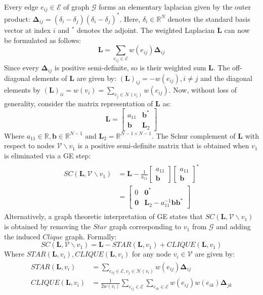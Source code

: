 \documentclass{article}
\def\mL{{\mathbf{L}}}
\def\vzero{{\mathbf{0}}}
\def\vb{{\mathbf{b}}}
\def\gE{{\mathcal{E}}}
\def\gG{{\mathcal{G}}}
\def\gV{{\mathcal{V}}}
\def\sR{{\mathbb{R}}}
\theoremstyle{plain}
\theoremstyle{definition}
\theoremstyle{remark}
\begin{document}
Every edge $e_{ij} \in \gE$ of graph $\gG$ forms an elementary laplacian given by the outer product:
$\mathbf{\Delta}_{ij} = (\delta_i-\delta_j)(\delta_i-\delta_j)^*
$. Here, $\delta_i \in \sR^N$ denotes the standard basis vector at index $i$ and $^*$ denotes the adjoint. The weighted Laplacian $\mL$ can now be formulated as follows:
\begin{equation}
\label{eq:lap}
\mL = \sum_{e_{ij} \in \gE}w(e_{ij})\mathbf{\Delta}_{ij}
\end{equation}
Since every $\mathbf{\Delta}_{ij}$ is positive semi-definite, so is their weighted sum $\mL$. The off-diagonal elements of $\mL$ are given by: $(\mL)_{ij} = -w(e_{ij}), i \neq j$ and the diagonal elements by $(\mL)_{ii} = w(v_i) = \sum_{v_j \in \mathcal{N}(v_i)} w(e_{ij})$. Now, without loss of generality, consider the matrix representation of $\mL$ as:
\begin{equation}
\mL = \begin{bmatrix}
a_{11} & \vb^{*}\\
\vb & \mL_2
\end{bmatrix}
\end{equation}
Where $a_{11} \in \sR, \vb \in \sR^{N-1}$ and $\mL_2 = \sR^{N-1 \times N-1}$. The Schur complement of $\mL$ with respect to nodes $\gV \backslash v_1$ is a positive semi-definite matrix that is obtained when $v_1$ is eliminated via a GE step:
\begin{align}
\begin{split}
\label{eq:sc_matrix}
    SC(\mL, \gV \backslash v_1) &= \mL - \frac{1}{a_{11}}\begin{bmatrix}a_{11}\\ \vb \end{bmatrix}\begin{bmatrix}a_{11}\\ \vb \end{bmatrix}^* \\
&= \begin{bmatrix}0 & \vzero^*\\ \vzero & \mL_2 - a_{11}^{-1}\vb\vb^*\end{bmatrix}
\end{split}
\end{align}
Alternatively, a graph theoretic interpretation of GE states that $SC(\mL, \gV \backslash v_1)$ is obtained by removing the $\textit{Star}$ graph corresponding to $v_1$ from $\gG$ and adding the induced $\textit{Clique}$ graph. Formally:
\begin{equation}
\label{eq:sc_star_clique}
    SC(\mL, \gV \backslash v_1) = \mL - \textit{STAR}(\mL, v_1) + \textit{CLIQUE}(\mL, v_1)
\end{equation}
Where $\textit{STAR}(\mL, v_i), \textit{CLIQUE}(\mL, v_i)$ for any node $v_i \in \gV$ are given by:
\begin{align}
\label{eq:star_clique}
\begin{split}
\textit{STAR}(\mL, v_i) & = \sum_{e_{ij}\in \gE, v_j \in \mathcal{N}(v_i)}w(e_{ij})\mathbf{\Delta}_{ij} \\
\textit{CLIQUE}(\mL, v_i) & = \frac{1}{2w(v_i)}\sum_{e_{ij}\in \gE}\sum_{e_{ik}\in \gE}w(e_{ij})w(e_{ik})\mathbf{\Delta}_{jk}    
\end{split}
\end{align}
\end{document}

